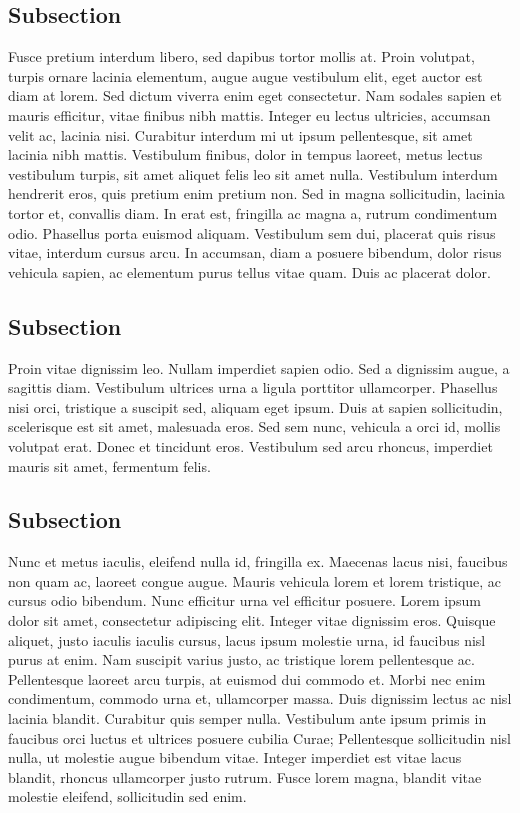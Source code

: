 \subsection*{Subsection}

Fusce pretium interdum libero, sed dapibus tortor mollis at. Proin volutpat, turpis ornare lacinia elementum, augue augue vestibulum elit, eget auctor est diam at lorem. Sed dictum viverra enim eget consectetur. Nam sodales sapien et mauris efficitur, vitae finibus nibh mattis. Integer eu lectus ultricies, accumsan velit ac, lacinia nisi. Curabitur interdum mi ut ipsum pellentesque, sit amet lacinia nibh mattis. Vestibulum finibus, dolor in tempus laoreet, metus lectus vestibulum turpis, sit amet aliquet felis leo sit amet nulla. Vestibulum interdum hendrerit eros, quis pretium enim pretium non. Sed in magna sollicitudin, lacinia tortor et, convallis diam. In erat est, fringilla ac magna a, rutrum condimentum odio. Phasellus porta euismod aliquam. Vestibulum sem dui, placerat quis risus vitae, interdum cursus arcu. In accumsan, diam a posuere bibendum, dolor risus vehicula sapien, ac elementum purus tellus vitae quam. Duis ac placerat dolor. 



\subsection*{Subsection}

Proin vitae dignissim leo. Nullam imperdiet sapien odio. Sed a dignissim augue, a sagittis diam. Vestibulum ultrices urna a ligula porttitor ullamcorper. Phasellus nisi orci, tristique a suscipit sed, aliquam eget ipsum. Duis at sapien sollicitudin, scelerisque est sit amet, malesuada eros. Sed sem nunc, vehicula a orci id, mollis volutpat erat. Donec et tincidunt eros. Vestibulum sed arcu rhoncus, imperdiet mauris sit amet, fermentum felis. 

\subsection*{Subsection}

Nunc et metus iaculis, eleifend nulla id, fringilla ex. Maecenas lacus nisi, faucibus non quam ac, laoreet congue augue. Mauris vehicula lorem et lorem tristique, ac cursus odio bibendum. Nunc efficitur urna vel efficitur posuere. Lorem ipsum dolor sit amet, consectetur adipiscing elit. Integer vitae dignissim eros. Quisque aliquet, justo iaculis iaculis cursus, lacus ipsum molestie urna, id faucibus nisl purus at enim. Nam suscipit varius justo, ac tristique lorem pellentesque ac. Pellentesque laoreet arcu turpis, at euismod dui commodo et. Morbi nec enim condimentum, commodo urna et, ullamcorper massa. Duis dignissim lectus ac nisl lacinia blandit. Curabitur quis semper nulla. Vestibulum ante ipsum primis in faucibus orci luctus et ultrices posuere cubilia Curae; Pellentesque sollicitudin nisl nulla, ut molestie augue bibendum vitae. Integer imperdiet est vitae lacus blandit, rhoncus ullamcorper justo rutrum. Fusce lorem magna, blandit vitae molestie eleifend, sollicitudin sed enim. 



